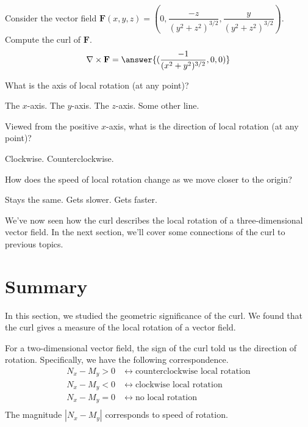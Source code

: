 \documentclass{ximera}
\begin{document}
\begin{problem}
Consider the vector field $\mathbf{F}(x,y,z)=\left(0,\dfrac{-z}{(y^2+z^2)^{3/2}},\dfrac{y}{(y^2+z^2)^{3/2}}\right)$. Compute the curl of $\mathbf{F}$.
\[
\nabla\times\mathbf{F} = \answer{(\frac{-1}{(x^2+y^2)^{3/2}},0,0)}
\]
\begin{problem}
What is the axis of local rotation (at any point)?
\begin{multipleChoice}
\choice[correct] The $x$-axis.
\choice The $y$-axis.
\choice The $z$-axis.
\choice Some other line.
\end{multipleChoice}
\begin{problem}
Viewed from the positive $x$-axis, what is the direction of local rotation (at any point)?
\begin{multipleChoice}
\choice[correct] Clockwise.
\choice Counterclockwise.
\end{multipleChoice}
\begin{problem}
How does the speed of local rotation change as we move closer to the origin?
\begin{multipleChoice}
\choice Stays the same.
\choice Gets slower.
\choice[correct] Gets faster.
\end{multipleChoice}
\end{problem}
\end{problem}
\end{problem}
\end{problem}

We've now seen how the curl describes the local rotation of a three-dimensional vector field. In the next section, we'll cover some connections of the curl to previous topics.

\section{Summary}

In this section, we studied the geometric significance of the curl. We found that the curl gives a measure of the local rotation of a vector field.

For a two-dimensional vector field, the sign of the curl told us the direction of rotation. Specifically, we have the following correspondence.
\begin{align}
N_x-M_y>0\;&\longleftrightarrow\; \textrm{counterclockwise local rotation}\\
N_x-M_y<0\;&\longleftrightarrow\; \textrm{clockwise local rotation}\\
N_x-M_y=0\;&\longleftrightarrow\; \textrm{no local rotation}\\
\end{align}
The magnitude $|N_x-M_y|$ corresponds to speed of rotation.
\end{document}
